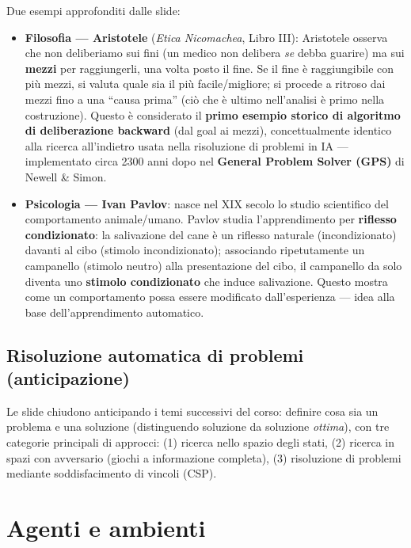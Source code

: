 \documentclass[11pt,a4paper]{report}
\begin{document}
Due esempi approfonditi dalle slide:

\begin{itemize}
  \item \textbf{Filosofia --- Aristotele} (\emph{Etica Nicomachea}, Libro III): Aristotele osserva che non deliberiamo sui fini (un medico non delibera \emph{se} debba guarire) ma sui \textbf{mezzi} per raggiungerli, una volta posto il fine. Se il fine è raggiungibile con più mezzi, si valuta quale sia il più facile/migliore; si procede a ritroso dai mezzi fino a una ``causa prima'' (ciò che è ultimo nell'analisi è primo nella costruzione). Questo è considerato il \textbf{primo esempio storico di algoritmo di deliberazione backward} (dal goal ai mezzi), concettualmente identico alla ricerca all'indietro usata nella risoluzione di problemi in IA --- implementato circa 2300 anni dopo nel \textbf{General Problem Solver (GPS)} di Newell \& Simon.
  \item \textbf{Psicologia --- Ivan Pavlov}: nasce nel XIX secolo lo studio scientifico del comportamento animale/umano. Pavlov studia l'apprendimento per \textbf{riflesso condizionato}: la salivazione del cane è un riflesso naturale (incondizionato) davanti al cibo (stimolo incondizionato); associando ripetutamente un campanello (stimolo neutro) alla presentazione del cibo, il campanello da solo diventa uno \textbf{stimolo condizionato} che induce salivazione. Questo mostra come un comportamento possa essere modificato dall'esperienza --- idea alla base dell'apprendimento automatico.
\end{itemize}

\subsection{Risoluzione automatica di problemi (anticipazione)}

Le slide chiudono anticipando i temi successivi del corso: definire cosa sia un problema e una soluzione (distinguendo soluzione da soluzione \emph{ottima}), con tre categorie principali di approcci: (1) ricerca nello spazio degli stati, (2) ricerca in spazi con avversario (giochi a informazione completa), (3) risoluzione di problemi mediante soddisfacimento di vincoli (CSP).

\section{Agenti e ambienti}
\end{document}
